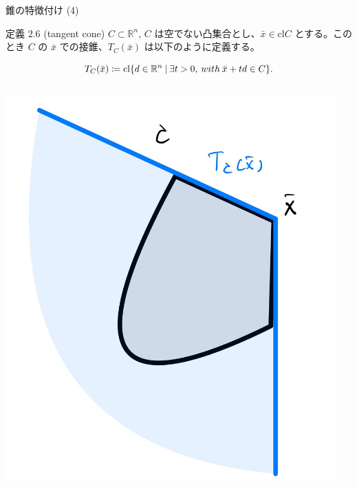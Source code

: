 \documentclass[aspectratio=169, dvipdfmx, 11pt]{beamer} %
\begin{document}
\begin{frame}{錐の特徴付け (4)}
  \begin{block}{定義 2.6 (tangent cone) }
    $C \subset \mathbb{R}^n$, $C$ は空でない凸集合とし、$\bar{x} \in \text{cl}C$ とする。このとき $C$ の $\bar{x}$ での接錐、$T_C(\bar{x})$ は以下のように定義する。

    \begin{equation}
      T_C(\bar{x}) \coloneqq \text{cl}\{ d \in \mathbb{R}^n \:|\: \exists t > 0, \:with\: \bar{x} + td \in C \}. \notag
    \end{equation}

  \end{block}

  \centering
  \begin{columns}
    \begin{column}{0.48\textwidth}
      \includegraphics[keepaspectratio, scale=0.06]{figures/tangent_cone_1.jpg}
    \end{column}
    \begin{column}{0.48\textwidth}

\end{column}
\end{columns}
\end{frame}
\end{document}
